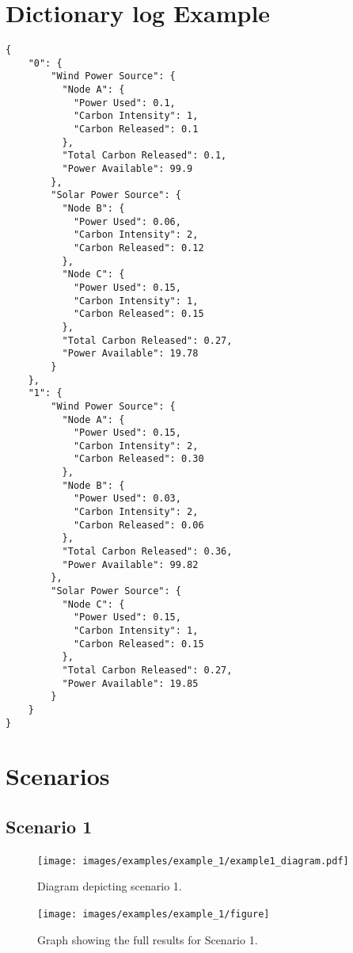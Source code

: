\documentclass{l4proj}
\begin{document}
\section{Dictionary log Example}
\begin{lstlisting}[caption={Example dictionary structure used by the power domain.},label={lst:dic-log}]
{
    "0": {
        "Wind Power Source": {
          "Node A": {
            "Power Used": 0.1,
            "Carbon Intensity": 1,
            "Carbon Released": 0.1
          },
          "Total Carbon Released": 0.1,
          "Power Available": 99.9
        },
        "Solar Power Source": {
          "Node B": {
            "Power Used": 0.06,
            "Carbon Intensity": 2,
            "Carbon Released": 0.12
          },
          "Node C": {
            "Power Used": 0.15,
            "Carbon Intensity": 1,
            "Carbon Released": 0.15
          },
          "Total Carbon Released": 0.27,
          "Power Available": 19.78
        }
    },
    "1": {
        "Wind Power Source": {
          "Node A": {
            "Power Used": 0.15,
            "Carbon Intensity": 2,
            "Carbon Released": 0.30
          },
          "Node B": {
            "Power Used": 0.03,
            "Carbon Intensity": 2,
            "Carbon Released": 0.06
          },
          "Total Carbon Released": 0.36,
          "Power Available": 99.82
        },
        "Solar Power Source": {
          "Node C": {
            "Power Used": 0.15,
            "Carbon Intensity": 1,
            "Carbon Released": 0.15
          },
          "Total Carbon Released": 0.27,
          "Power Available": 19.85
        }
    }
}
\end{lstlisting}
\clearpage
\section{Scenarios}\label{apen:subsec:scen1}
\subsection{Scenario 1}\label{apen:scen1}
\begin{figure}[h]
    \centering
    \texttt{[image: images/examples/example\_1/example1\_diagram.pdf]}
    ~
    \caption{Diagram depicting scenario 1.}
    \label{fig:example1_diagram}
\end{figure}
\clearpage
\begin{figure}[htbp]
    \centering
    \texttt{[image: images/examples/example\_1/figure]}
    ~
    \caption{Graph showing the full results for Scenario 1.}
    \label{fig:example1}
\end{figure}
\end{document}
